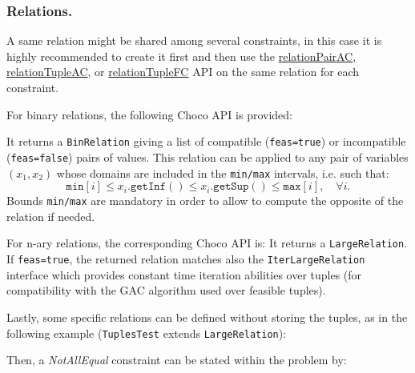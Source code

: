 \subsubsection{Relations.}
A same relation might be shared among several constraints, in this case it is highly recommended to create it first and then use the \hyperlink{relationpairac:relationpairacconstraint}{relationPairAC}, \hyperlink{relationtupleac:relationtupleacconstraint}{relationTupleAC}, or \hyperlink{relationtuplefc:relationtuplefcconstraint}{relationTupleFC} API  on the same relation for each constraint.

For binary relations, the following Choco API is provided:

It returns a \texttt{BinRelation} giving a list of compatible (\texttt{feas=true}) or incompatible (\texttt{feas=false}) pairs of values. This relation can be applied to any pair of variables $(x_1,x_2)$ whose domains are included in the \texttt{min/max} intervals, i.e. such that:
$$\mathtt{min}[i] \le x_i.\mathtt{getInf}() \le x_i.\mathtt{getSup}() \le  \mathtt{max}[i],\quad \forall i.$$
Bounds \texttt{min/max} are mandatory in order to allow to compute the opposite of the relation if needed.

For n-ary relations, the corresponding Choco API is:
It returns a \texttt{LargeRelation}. If \texttt{feas=true}, the returned relation matches also the \texttt{IterLargeRelation} interface which provides constant time iteration abilities over tuples (for compatibility with the GAC algorithm used over feasible tuples).


Lastly, some specific relations can be defined without storing the tuples, as in the following example (\texttt{TuplesTest} extends \texttt{LargeRelation}):

Then, a \emph{NotAllEqual} constraint can be stated within the problem by:




